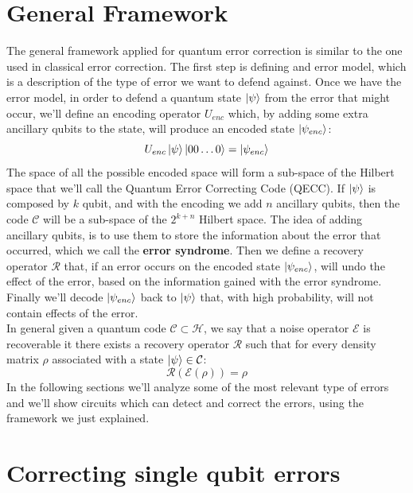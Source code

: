 \documentclass{article}
\begin{document}
	\section{General Framework}
	The general framework applied for quantum error correction is similar to the one used in classical error correction. The first step is defining and error model, which is a description of the type of error we want to defend against. Once we have the error model, in order to defend a quantum state $\ket{\psi}$ from the error that might occur, we'll define an encoding operator $U_{enc}$ which, by adding some extra ancillary qubits to the state, will produce an encoded state $\ket{\psi_{enc}}$:
	\[ U_{enc}\ket{\psi}\ket{00\dots0} = \ket{\psi_{enc}} \]
	The space of all the possible encoded space will form a sub-space of the Hilbert space that we'll call the Quantum Error Correcting Code (QECC). If $\ket{\psi}$ is composed by $k$ qubit, and with the encoding we add $n$ ancillary qubits, then the code $\mathcal{C}$ will be a sub-space of the $2^{k+n}$ Hilbert space. The idea of adding ancillary qubits, is to use them to store the information about the error that occurred, which we call the \textbf{error syndrome}. Then we define a recovery operator $\mathcal{R}$ that, if an error occurs on the encoded state $\ket{\psi_{enc}}$, will undo the effect of the error, based on the information gained with the error syndrome. Finally we'll decode $\ket{\psi_{enc}}$ back to $\ket{\psi}$ that, with high probability, will not contain effects of the error.\\
	In general given a quantum code $\mathcal{C} \subset \mathcal{H}$, we say that a noise operator $\mathcal{E}$ is recoverable it there exists a recovery operator $\mathcal{R}$ such that for every density matrix $\rho$ associated with a state $\ket{\psi} \in \mathcal{C}$:
	\[ \mathcal{R(\mathcal{E}(\rho))} = \rho\]
	In the following sections we'll analyze some of the most relevant type of errors and we'll show circuits which can detect and correct the errors, using the framework we just explained.
		
	\section{Correcting single qubit errors}
\end{document}
